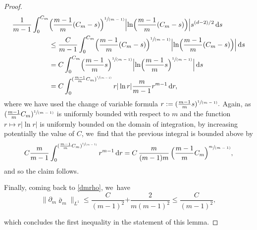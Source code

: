\documentclass[10pt]{amsart}
\newcommand{\spfrac}[2]{\sfrac{#1}{(#2)}}
\newcommand{\prt}[1]{(#1)}
\newcommand{\Bprt}[1]{\Bigl(#1\Bigr)}
\newcommand{\dx}[1]{\mathop{}\!\mathrm{d} #1}
\theoremstyle{plain}
\theoremstyle{remark}
\begin{document}
\begin{proof}
\begin{align*}
\frac{1}{m-1}\int_0^{C_m} & \Bprt{\frac{m-1}{m}(C_m -s)}^{\spfrac{1}{m-1}} \Bigl|\ln \Bprt{\frac{m-1}{m}(C_m -s)} \Bigr| s^{(d-2)/2} \dx s\\
& \le \frac{C}{m-1}\int_0^{C_m} \Bprt{\frac{m-1}{m}(C_m -s)}^{\spfrac{1}{m-1}} \Bigl|\ln \Bprt{\frac{m-1}{m}(C_m -s)} \Bigr| \dx s\\
& = C\int_0^{C_m} \Bprt{\frac{m-1}{m}s}^{\spfrac{1}{m-1}} \Bigl|\ln \Bprt{\frac{m-1}{m}s}^{\spfrac{1}{m-1}} \Bigr| \dx s\\
& = C\int_0^{\prt{\frac{m-1}{m}C_{m}}^{\spfrac{1}{m-1}}} r |\ln r| \frac{m}{m-1} r^{m-1}\dx r,
\end{align*}
where we have used the change of variable formula $r:=\prt{\frac{m-1}{m}s}^{\spfrac{1}{m-1}}.$ Again, as $\prt{\frac{m-1}{m}C_{m}}^{\spfrac{1}{m-1}}$ is uniformly bounded with respect to $m$ and the function $r\mapsto r |\ln r|$ is uniformly bounded on the domain of integration, by increasing potentially the value of $C$, we~find that the previous integral is bounded above by
\begin{align*}
C\frac{m}{m-1} \int_0^{\prt{\frac{m-1}{m}C_{m}}^{\spfrac{1}{m-1}}} r^{m-1}\dx r = C\,\frac{m}{(m-1)m}\, \Bprt{\frac{m-1}{m}C_{m}}^{\spfrac{m}{m-1}},
\end{align*}
and so the claim follows.

Finally, coming back to \eqref{dmrho}, we~have
\begin{equation}\label{rate l1}
\|\partial_m \bar\varrho_m\|_{L^1}\leq \frac{C}{(m-1)^2}{+ \frac{2}{m(m-1)^2} \leq \frac{C}{(m-1)^2}},
\end{equation}
{ which concludes the first inequality in the statement of this lemma.

}
\end{proof}
\end{document}
